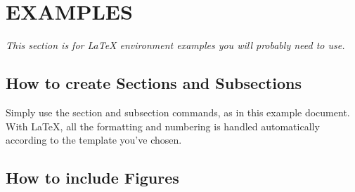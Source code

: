 \documentclass[11pt,twocolumn]{article}
\begin{document}
	
	

%
%
%


\section{EXAMPLES}
\label{sec:examples}

\textit{This section is for \LaTeX{} environment examples you will probably need to use.}

\subsection{How to create Sections and Subsections}

Simply use the section and subsection commands, as in this example document. With \LaTeX{}, all the formatting and numbering is handled automatically according to the template you've chosen.

\subsection{How to include Figures}
\end{document}
